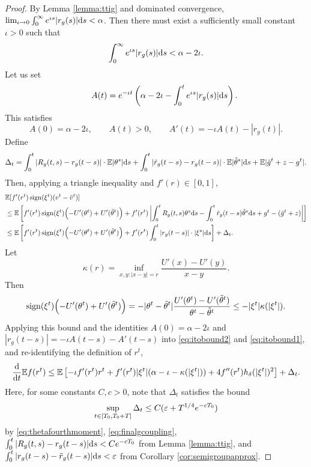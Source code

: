 \begin{proof}
By Lemma \ref{lemma:ttig} and dominated convergence,
$\lim_{\iota \to 0} \int_0^\infty e^{\iota s} |r_g(s)|\mathrm{d} s<\alpha$. Then
there must exist a sufficiently small constant $\iota>0$ such that
\[\int_0^\infty e^{\iota s} |r_g(s)|\mathrm{d} s<\alpha-2\iota.\]
Let us set
\[\qquad A(t)=e^{-\iota t}\left(\alpha-2\iota-\int_0^t e^{\iota s}|r_g(s)|\mathrm{d} s
\right).\]
This satisfies
\[A(0)=\alpha-2\iota, \qquad A(t)>0, \qquad A'(t)={-}\iota A(t)-|r_g(t)|.\]
Define
\[\Delta_t=\int_0^t |R_g(t,s)-r_g(t-s)| \cdot \mathbb{E}|\theta^s|\mathrm{d} s
+\int_0^t |\tilde r_g(t-s)-r_g(t-s)| \cdot \mathbb{E}|\tilde \theta^s|\mathrm{d} s
+\mathbb{E}|\tilde g^t+z-g^t|.\]
Then, applying a triangle inequality and $f'(r) \in [0,1]$,
\begin{align}
&\mathbb{E}[f'(r^t)\operatorname{sign}(\xi^t)(v^t-\tilde v^t)]\notag\\
&\leq \mathbb{E}\left[f'(r^t)\operatorname{sign}(\xi^t)\Big({-}U'(\theta^t)+U'(\tilde \theta^t)\Big)
+f'(r^t)\left|\int_0^t R_g(t,s)\theta^s\mathrm{d} s
-\int_0^t \tilde r_g(t-s)\tilde \theta^s\mathrm{d} s+g^t-(\tilde g^t+z)\right|\right]\notag\\
&\leq \mathbb{E}\left[f'(r^t)\operatorname{sign}(\xi^t)\Big({-}U'(\theta^t)+U'(\tilde \theta^t)\Big)
+f'(r^t)\int_0^t |r_g(t-s)| \cdot |\xi^s|\mathrm{d} s\right]+\Delta_t.
\label{eq:itobound2}
\end{align}
Let
\[\kappa(r)=\inf_{x,y:|x-y|=r} \frac{U'(x)-U'(y)}{x-y}.\]
Then
\[\operatorname{sign}(\xi^t)\Big({-}U'(\theta^t)+U'(\tilde \theta^t)\Big)
={-}|\theta^t-\tilde \theta^t|
\frac{U'(\theta^t)-U'(\tilde \theta^t)}{\theta^t-\tilde \theta^t}
\leq -|\xi^t|\kappa(|\xi^t|).\]
Applying this bound and the identities $A(0)=\alpha-2\iota$ and
$|r_g(t-s)|={-}\iota A(t-s)-A'(t-s)$ into
\eqref{eq:itobound2} and \eqref{eq:itobound1},
and re-identifying the definition of $r^t$,
\begin{equation}\label{eq:itoboundfinal}
\frac{\mathrm{d}}{\mathrm{d} t}
\mathbb{E} f(r^t)\leq \mathbb{E}\left[-\iota f'(r^t)r^t
+f'(r^t)|\xi^t|(\alpha-\iota-\kappa(|\xi^t|))
+4f''(r^t)h_\delta(|\xi^t|)^2\right]+\Delta_t.
\end{equation}
Here, for some constants $C,c>0$, note that $\Delta_t$ satisfies the bound
\begin{equation}\label{eq:Deltatbound}
\sup_{t \in [T_0,T_0+T]} \Delta_t \leq C(\varepsilon+T^{1/4}e^{-cT_0})
\end{equation}
by \eqref{eq:thetafourthmoment}, \eqref{eq:finalgcoupling}, 
$\int_0^t |R_g(t,s)-r_g(t-s)|\mathrm{d} s<Ce^{-cT_0}$
from Lemma \ref{lemma:ttig}, and
$\int_0^t |r_g(t-s)-\tilde r_g(t-s)|\mathrm{d} s<\varepsilon$ from
Corollary \ref{cor:semigroupapprox}.


\end{proof}
